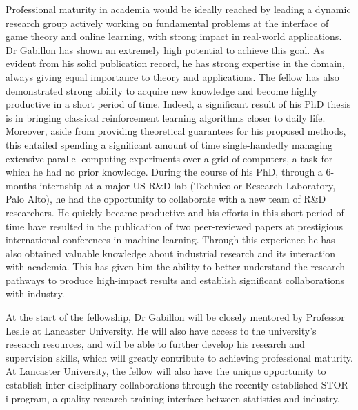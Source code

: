 Professional maturity in academia would be ideally reached by leading a dynamic research group actively working on fundamental problems at the interface of game theory and online learning, with strong impact in real-world applications. Dr Gabillon has shown an extremely high potential to achieve this goal. As evident from his solid publication record, he has strong expertise in the domain, always giving equal importance to theory and applications. The fellow has also demonstrated strong ability to acquire new knowledge  and become highly productive in a short period of time. Indeed, a significant result of his PhD thesis is in bringing classical reinforcement learning algorithms closer to daily life. Moreover, aside from providing theoretical guarantees for his proposed methods, this entailed spending a significant amount of time single-handedly managing extensive parallel-computing experiments over a grid of computers, a task for which he had no prior knowledge. During the course of his PhD, through a 6-months internship at a major US R\&D lab (Technicolor Research Laboratory, Palo Alto), he had the opportunity to collaborate with a new team of R\&D researchers. He quickly became productive and his efforts in this short period of time have resulted in the publication of two peer-reviewed papers at prestigious international conferences in machine learning. Through this experience he has also obtained valuable knowledge about industrial research and its interaction with academia. This has given him the ability to better understand the research pathways to produce high-impact results and establish significant collaborations with industry.

At the start of the fellowship, Dr Gabillon will be closely mentored by Professor Leslie at Lancaster University. He will also have access to the university's research resources, and will be able to further develop his research and supervision skills, which will greatly contribute to achieving professional maturity. At Lancaster University, the fellow will also have the unique opportunity to establish inter-disciplinary collaborations through the recently established STOR-i program, a quality research training interface between statistics and industry. 